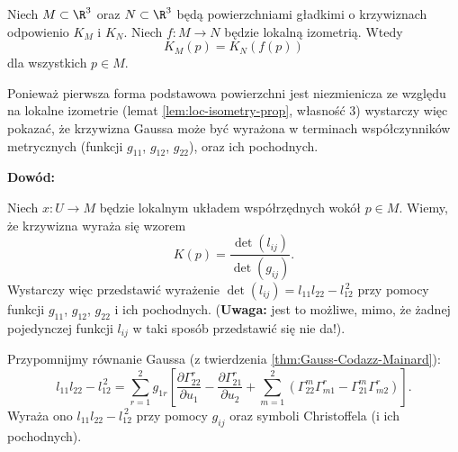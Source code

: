 \begin{frame}

\begin{twierdzenie}
Niech $M\subset \R^3$ oraz $N\subset \R^3$ będą powierzchniami gładkimi o krzywiznach odpowienio $K_M$ i $K_N$. Niech $f\colon M\to N$ będzie lokalną izometrią. \pause Wtedy \[K_M(p)=K_N(f(p))\] dla wszystkich $p\in M$.
\end{twierdzenie}

\pause Ponieważ pierwsza forma podstawowa powierzchni jest niezmienicza ze względu na lokalne izometrie (lemat \ref{lem:loc-isometry-prop}, własność 3) wystarczy więc pokazać, że krzywizna Gaussa może być wyrażona w  terminach współczynników metrycznych (funkcji $g_{11}$, $g_{12}$, $g_{22}$), oraz ich pochodnych.

\end{frame}
\begin{frame}[<+->]
\textcolor{ared}{\textbf{Dowód:}}\\\pause

Niech $x\colon U\to M$ będzie lokalnym układem współrzędnych wokół $p\in M$. Wiemy, że krzywizna wyraża się wzorem
\[K(p)=\frac{\det(l_{ij})}{\det (g_{ij})}.\]
\pause Wystarczy więc przedstawić wyrażenie $\det(l_{ij})=l_{11}l_{22}-l_{12}^{\,2}$ przy pomocy funkcji $g_{11}$, $g_{12}$, $g_{22}$ i ich pochodnych. (\textbf{Uwaga:} jest to możliwe, mimo, że żadnej pojedynczej funkcji $l_{ij}$ w taki sposób przedstawić się nie da!). 

\pause Przypomnijmy równanie Gaussa (z twierdzenia \ref{thm:Gauss-Codazz-Mainard}): 
\[l_{11}l_{22}-l_{12}^{\,2}=
\sum_{r=1}^{2}g_{1r}
\left[
\frac{\partial \Gamma^r_{22}} {\partial u_{1}}- \frac{\partial\Gamma ^r_{21}}{\partial u_{2}}+
\sum_{m=1}^2 \left(\Gamma^m_{22}\Gamma^r_{m1}-\Gamma^m_{21}\Gamma^r_{m2}\right)\right].\]
Wyraża ono $l_{11}l_{22}-l_{12}^{\,2}$ przy pomocy $g_{ij}$ oraz symboli Christoffela (i ich pochodnych). 

\end{frame}
